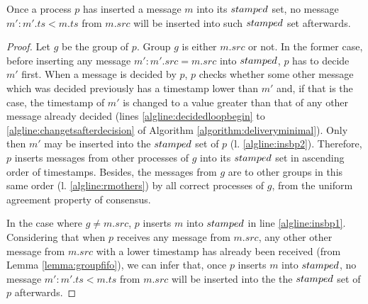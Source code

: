\documentclass[times, 10pt]{article}
\begin{document}
% 




\begin{lems} \label{lemma:oncedecidednotsmaller}
Once a process $p$ has inserted a message $m$ into its $stamped$ set, no message $m' : m'.ts < m.ts$ from $m.src$ will be inserted into such $stamped$ set afterwards.
\end{lems}

\begin{proof}
Let $g$ be the group of $p$. Group $g$ is either $m.src$ or not. In the former case, before inserting any message $m' : m'.src = m.src$ into $stamped$, $p$ has to decide $m'$ first. When a message is decided by $p$, $p$ checks whether some other message which was decided previously has a timestamp lower than $m'$ and, if that is the case, the timestamp of $m'$ is changed to a value greater than that of any other message already decided (lines \ref{algline:decidedloopbegin} to \ref{algline:changetsafterdecision} of Algorithm \ref{algorithm:deliveryminimal}). Only then $m'$ may be inserted into the $stamped$ set of $p$ (l. \ref{algline:insbp2}). Therefore, $p$ inserts messages from other processes of $g$ into its $stamped$ set in ascending order of timestamps. Besides, the messages from $g$ are \rmcast{} to other groups in this same order (l. \ref{algline:rmothers}) by all correct processes of $g$, from the uniform agreement property of consensus.

In the case where $g \neq m.src$, $p$ inserts $m$ into $stamped$ in line \ref{algline:insbp1}. Considering that when $p$ receives any message from $m.src$, any other other message from $m.src$ with a lower timestamp has already been received (from Lemma \ref{lemma:groupfifo}), we can infer that, once $p$ inserts $m$ into $stamped$, no message $m' : m'.ts < m.ts$ from $m.src$ will be inserted into the the $stamped$ set of $p$ afterwards.
\end{proof}
\end{document}
